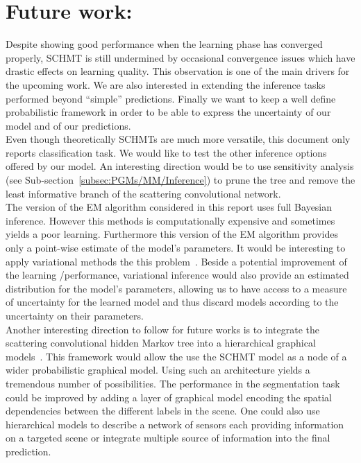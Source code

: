 \documentclass[a4paper,11pt]{report}
\begin{document}
  \section{Future work:}
		Despite showing good performance when the learning phase has converged properly, SCHMT is still undermined by occasional convergence issues which have drastic effects on learning quality. This observation is one of the main drivers for the upcoming work. We are also interested in extending the inference tasks performed beyond ``simple'' predictions. Finally we want to keep a well define probabilistic framework in order to be able to express the uncertainty of our model and of our predictions.\\
		
		Even though theoretically SCHMTs are much more versatile, this document only reports classification task. We would like to test the other inference options offered by our model. An interesting direction would be to use sensitivity analysis (see Sub-section~\ref{subsec:PGMs/MM/Inference}) to prune the tree and remove the least informative branch of the scattering convolutional network.\\ 
		
		The version of the EM algorithm considered in this report uses full Bayesian inference. However this methods is computationally expensive and sometimes yields a poor learning. Furthermore this version of the EM algorithm provides only a point-wise estimate of the model's parameters. It would be interesting to apply variational methods the this problem~\citep{wainwright2008graphical}. Beside a potential improvement of the learning /performance, variational inference would also provide an estimated distribution for the model's parameters, allowing us to have access to a measure of uncertainty for the learned model and thus discard models according to the uncertainty on their parameters.\\
		
		Another interesting direction to follow for future works is to integrate the scattering convolutional hidden Markov tree into a hierarchical graphical models~\citep{fine1998hierarchical}. This framework would allow the use the SCHMT model as a node of a wider probabilistic graphical model. Using such an architecture yields a tremendous number of possibilities. The performance in the segmentation task could be improved by adding a layer of graphical model encoding the spatial dependencies between the different labels in the scene. One could also use hierarchical models to describe a network of sensors each providing information on a targeted scene or integrate multiple source of information into the final prediction.\\
		
\end{document}
